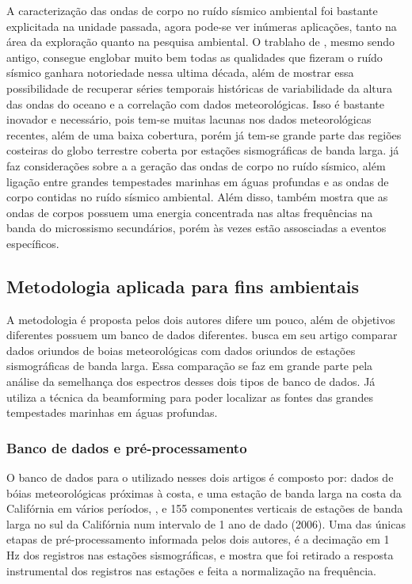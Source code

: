 \documentclass[paper,twocolumn]{geophysics}
\begin{document}
A caracterização das ondas de corpo no ruído sísmico ambiental foi bastante explicitada na unidade passada, agora pode-se ver inúmeras aplicações, tanto na área da exploração quanto na pesquisa ambiental.  O trablaho de \cite{bromirski_ocean_1999}, mesmo sendo antigo, consegue englobar muito bem todas as qualidades que fizeram o ruído sísmico ganhara notoriedade nessa ultima década, além de mostrar essa possibilidade de recuperar séries temporais históricas de variabilidade da altura das ondas do oceano e a correlação com dados meteorológicas. Isso é bastante inovador e necessário, pois tem-se muitas lacunas nos dados meteorológicas recentes, além de uma baixa cobertura, porém já tem-se grande parte das regiões costeiras do globo terrestre coberta por estações sismográficas de banda larga. \cite{gerstoft_global_2008} já faz considerações sobre a a geração das ondas de corpo no ruído sísmico, além ligação entre grandes tempestades marinhas em águas profundas e as ondas de corpo contidas no ruído sísmico ambiental. Além disso, também mostra que as ondas de corpos possuem uma energia concentrada nas altas frequências na banda do microssismo secundários, porém às vezes estão assosciadas a eventos específicos.

\subsection*{Metodologia aplicada para fins ambientais}

A metodologia é proposta pelos dois autores difere um pouco, além de objetivos diferentes possuem um banco de dados diferentes. \cite{bromirski_ocean_1999} busca em seu artigo comparar dados oriundos de boias meteorológicas com dados oriundos de estações sismográficas de banda larga. Essa comparação se faz em grande parte pela análise da semelhança dos espectros desses dois tipos de banco de dados. Já \cite{gerstoft_global_2008} utiliza a técnica da beamforming para poder localizar as fontes das grandes tempestades marinhas em águas profundas. 

\subsubsection*{Banco de dados e pré-processamento}

O banco de dados para o utilizado nesses dois artigos é composto por: dados de bóias meteorológicas próximas à costa, e uma estação de banda larga na costa da Califórnia em vários períodos, \cite{bromirski_ocean_1999}, e 155 componentes verticais de estações de banda larga no sul da Califórnia num intervalo de 1 ano de dado (2006). Uma das únicas etapas de pré-processamento informada pelos dois autores, é a decimação em 1 Hz dos registros nas estações sismográficas, e \cite{gerstoft_global_2008} mostra que foi retirado a resposta instrumental dos registros nas estações e feita a normalização na frequência.
\end{document}
